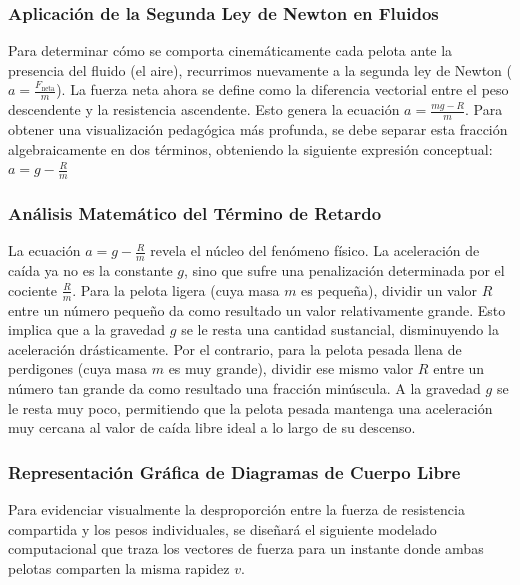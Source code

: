 \documentclass[12pt]{article}
\begin{document}
\subsubsection*{Aplicación de la Segunda Ley de Newton en Fluidos}
Para determinar cómo se comporta cinemáticamente cada pelota ante la presencia del fluido (el aire), recurrimos nuevamente a la segunda ley de Newton ($a = \frac{F_{\text{neta}}}{m}$). La fuerza neta ahora se define como la diferencia vectorial entre el peso descendente y la resistencia ascendente. Esto genera la ecuación $a = \frac{mg - R}{m}$.
Para obtener una visualización pedagógica más profunda, se debe separar esta fracción algebraicamente en dos términos, obteniendo la siguiente expresión conceptual:
$a = g - \frac{R}{m}$

\subsubsection*{Análisis Matemático del Término de Retardo}
La ecuación $a = g - \frac{R}{m}$ revela el núcleo del fenómeno físico. La aceleración de caída ya no es la constante $g$, sino que sufre una penalización determinada por el cociente $\frac{R}{m}$. Para la pelota ligera (cuya masa $m$ es pequeña), dividir un valor $R$ entre un número pequeño da como resultado un valor relativamente grande. Esto implica que a la gravedad $g$ se le resta una cantidad sustancial, disminuyendo la aceleración drásticamente.
Por el contrario, para la pelota pesada llena de perdigones (cuya masa $m$ es muy grande), dividir ese mismo valor $R$ entre un número tan grande da como resultado una fracción minúscula. A la gravedad $g$ se le resta muy poco, permitiendo que la pelota pesada mantenga una aceleración muy cercana al valor de caída libre ideal a lo largo de su descenso.

\subsubsection*{Representación Gráfica de Diagramas de Cuerpo Libre}
Para evidenciar visualmente la desproporción entre la fuerza de resistencia compartida y los pesos individuales, se diseñará el siguiente modelado computacional que traza los vectores de fuerza para un instante donde ambas pelotas comparten la misma rapidez $v$.
\end{document}
